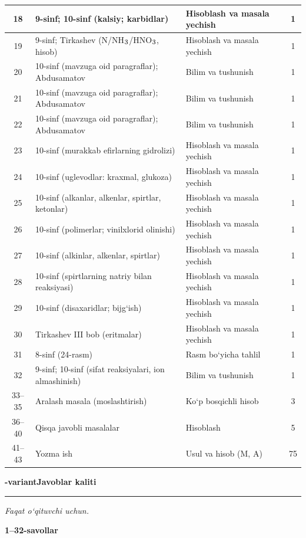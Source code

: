 \documentclass[11pt,a4paper]{article}
\renewcommand{\textsubscript}[1]{\ensuremath{_{\text{\fontsize{8}{8}\selectfont #1}}}}
\newcommand{\hdrpill}[1]{\begin{tikzpicture}[baseline=0pt]\node[fill=ygreen,text=white,rounded corners=8pt,inner xsep=10pt,inner ysep=5pt,font=\fontsize{13}{15}\bfseries\selectfont] at (0,0.475){#1};\end{tikzpicture}}
\newcommand{\curvar}{}\fancyhead[R]{\hdrpill{\curvar}}
\begin{document}
{\begin{longtable}{|c|p{7.2cm}|p{5.4cm}|c|}
18 & 9-sinf; 10-sinf (kalsiy; karbidlar) & Hisoblash va masala yechish & 1\\\hline
19 & 9-sinf; Tirkashev (N/NH\textsubscript{3}/HNO\textsubscript{3}, hisob) & Hisoblash va masala yechish & 1\\\hline
20 & 10-sinf (mavzuga oid paragraflar); Abdusamatov & Bilim va tushunish & 1\\\hline
21 & 10-sinf (mavzuga oid paragraflar); Abdusamatov & Bilim va tushunish & 1\\\hline
22 & 10-sinf (mavzuga oid paragraflar); Abdusamatov & Bilim va tushunish & 1\\\hline
23 & 10-sinf (murakkab efirlarning gidrolizi) & Hisoblash va masala yechish & 1\\\hline
24 & 10-sinf (uglevodlar: kraxmal, glukoza) & Hisoblash va masala yechish & 1\\\hline
25 & 10-sinf (alkanlar, alkenlar, spirtlar, ketonlar) & Hisoblash va masala yechish & 1\\\hline
26 & 10-sinf (polimerlar; vinilxlorid olinishi) & Hisoblash va masala yechish & 1\\\hline
27 & 10-sinf (alkinlar, alkenlar, spirtlar) & Hisoblash va masala yechish & 1\\\hline
28 & 10-sinf (spirtlarning natriy bilan reaksiyasi) & Hisoblash va masala yechish & 1\\\hline
29 & 10-sinf (disaxaridlar; bijg`ish) & Hisoblash va masala yechish & 1\\\hline
30 & Tirkashev III bob (eritmalar) & Hisoblash va masala yechish & 1\\\hline
31 & 8-sinf (24-rasm) & Rasm bo`yicha tahlil & 1\\\hline
32 & 9-sinf; 10-sinf (sifat reaksiyalari, ion almashinish) & Bilim va tushunish & 1\\\hline
33--35 & Aralash masala (moslashtirish) & Ko`p bosqichli hisob & 3\\\hline
36--40 & Qisqa javobli masalalar & Hisoblash & 5\\\hline
41--43 & Yozma ish & Usul va hisob (M, A) & 75\\\hline
\end{longtable}}
\renewcommand{\curvar}{Javoblar}
\newpage
\noindent\textbf{\fontsize{13}{15}-variant}\hfill \textbf{Javoblar kaliti}\par\smallskip\hrule\smallskip
\textit{Faqat o`qituvchi uchun.}\par\medskip
\noindent\textbf{1--32-savollar}\par\smallskip
\end{document}
